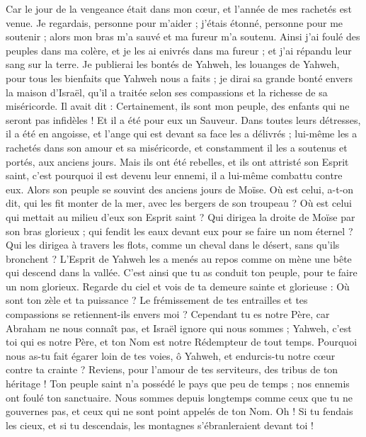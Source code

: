 \begin{multicols}{2}
Car le jour de la vengeance était dans mon cœur, et l'année de mes rachetés est venue.
Je regardais, personne pour m'aider ; j'étais étonné, personne pour me soutenir ; alors mon bras m'a sauvé et ma fureur m'a soutenu.
Ainsi j'ai foulé des peuples dans ma colère, et je les ai enivrés dans ma fureur ; et j'ai répandu leur sang sur la terre.
Je publierai les bontés de Yahweh, les louanges de Yahweh, pour tous les bienfaits que Yahweh nous a faits ; je dirai sa grande bonté envers la maison d'Israël, qu'il a traitée selon ses compassions et la richesse de sa miséricorde.
Il avait dit : Certainement, ils sont mon peuple, des enfants qui ne seront pas infidèles ! Et il a été pour eux un Sauveur.
Dans toutes leurs détresses, il a été en angoisse, et l'ange qui est devant sa face les a délivrés ; lui-même les a rachetés dans son amour et sa miséricorde, et constamment il les a soutenus et portés, aux anciens jours.
Mais ils ont été rebelles, et ils ont attristé son Esprit saint, c'est pourquoi il est devenu leur ennemi, il a lui-même combattu contre eux.
Alors son peuple se souvint des anciens jours de Moïse. Où est celui, a-t-on dit, qui les fit monter de la mer, avec les bergers de son troupeau ? Où est celui qui mettait au milieu d'eux son Esprit saint ?
Qui dirigea la droite de Moïse par son bras glorieux ; qui fendit les eaux devant eux pour se faire un nom éternel ?
Qui les dirigea à travers les flots, comme un cheval dans le désert, sans qu'ils bronchent ?
L'Esprit de Yahweh les a menés au repos comme on mène une bête qui descend dans la vallée. C'est ainsi que tu as conduit ton peuple, pour te faire un nom glorieux.
Regarde du ciel et vois de ta demeure sainte et glorieuse : Où sont ton zèle et ta puissance ? Le frémissement de tes entrailles et tes compassions se retiennent-ils envers moi ?
Cependant tu es notre Père, car Abraham ne nous connaît pas, et Israël ignore qui nous sommes ; Yahweh, c'est toi qui es notre Père, et ton Nom est notre Rédempteur de tout temps.
Pourquoi nous as-tu fait égarer loin de tes voies, ô Yahweh, et endurcis-tu notre cœur contre ta crainte ? Reviens, pour l'amour de tes serviteurs, des tribus de ton héritage !
Ton peuple saint n'a possédé le pays que peu de temps ; nos ennemis ont foulé ton sanctuaire.
Nous sommes depuis longtemps comme ceux que tu ne gouvernes pas, et ceux qui ne sont point appelés de ton Nom. Oh ! Si tu fendais les cieux, et si tu descendais, les montagnes s'ébranleraient devant toi !

\end{multicols}
